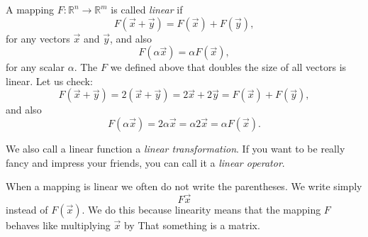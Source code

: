 A mapping $F \colon {\mathbb R}^n \to {\mathbb R}^m$
is called \emph{linear} if
\begin{equation*}
F(\vec{x}+\vec{y}) = F(\vec{x})+F(\vec{y}),
\end{equation*}
for any vectors $\vec{x}$ and $\vec{y}$,
and also
\begin{equation*}
F(\alpha \vec{x}) = \alpha F(\vec{x}) ,
\end{equation*}
for any scalar $\alpha$.
The $F$ we defined above that doubles the size of all vectors is linear.  Let
us check:
\begin{equation*}
F(\vec{x}+\vec{y})
=
2(\vec{x}+\vec{y})
=
2\vec{x}+2\vec{y}
=
F(\vec{x})+F(\vec{y}) ,
\end{equation*}
and also
\begin{equation*}
F(\alpha \vec{x}) = 2 \alpha \vec{x} = \alpha 2 \vec{x} = \alpha F(\vec{x}) .
\end{equation*}

We also call a linear function a
\emph{linear transformation}.
If you want to be really fancy and impress your friends, you can call it a
\emph{linear operator}.

When a mapping is linear we often do not write the parentheses.  We write
simply
\begin{equation*}
F \vec{x}
\end{equation*}
instead of $F(\vec{x})$.  We do this because linearity means that the
mapping $F$
behaves like multiplying $\vec{x}$ by 
That something is a matrix.



